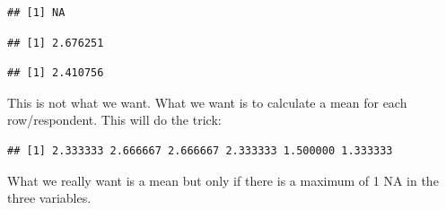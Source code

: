 \documentclass[
]{book}
\newenvironment{Shaded}{\begin{snugshade}}{\end{snugshade}}
\newcommand{\DataTypeTok}[1]{\textcolor[rgb]{0.13,0.29,0.53}{#1}}
\newcommand{\KeywordTok}[1]{\textcolor[rgb]{0.13,0.29,0.53}{\textbf{#1}}}
\newcommand{\NormalTok}[1]{#1}
\newcommand{\OperatorTok}[1]{\textcolor[rgb]{0.81,0.36,0.00}{\textbf{#1}}}
\newcommand{\OtherTok}[1]{\textcolor[rgb]{0.56,0.35,0.01}{#1}}
\newcommand{\StringTok}[1]{\textcolor[rgb]{0.31,0.60,0.02}{#1}}
\begin{document}
\begin{verbatim}
## [1] NA
\end{verbatim}

\begin{Shaded}
\end{Shaded}

\begin{verbatim}
## [1] 2.676251
\end{verbatim}

\begin{Shaded}
\end{Shaded}

\begin{verbatim}
## [1] 2.410756
\end{verbatim}

This is not what we want. What we want is to calculate a mean for each row/respondent. This will do the trick:

\begin{Shaded}
\end{Shaded}

\begin{verbatim}
## [1] 2.333333 2.666667 2.666667 2.333333 1.500000 1.333333
\end{verbatim}

What we really want is a mean but only if there is a maximum of 1 NA in the three variables.
\end{document}
